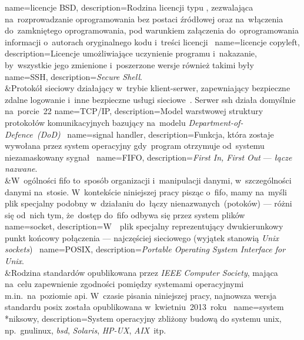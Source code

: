 {
	name={licencje BSD},
	description={Rodzina licencji typu , zezwalająca na~rozprowadzanie oprogramowania bez postaci źródłowej oraz na~włączenia do~zamkniętego oprogramowania, pod warunkiem załączenia do~oprogramowania informacji o~autorach oryginalnego kodu i~treści licencji~\cite{bsd,wiki:licenses-comparison}}
}
{
	name={licencje copyleft},
	description={Licencje umożliwiające uczynienie programu  i~nakazanie, by~wszystkie jego zmienione i~poszerzone wersje również takimi były~\cite{copyleft,wiki:licenses-comparison}}
}
{
	name={SSH},
	description={\emph{Secure Shell}.\\&Protokół sieciowy działający w~trybie klient-serwer, zapewniający bezpieczne zdalne logowanie i~inne bezpieczne usługi sieciowe~\cite{rfc:ssh}. Serwer \gls{ssh} działa domyślnie na~porcie~22}
}
{
	name={TCP/IP},
	description={Model warstwowej struktury protokołów komunikacyjnych bazujący na~modelu \emph{Department-of-Defence~(DoD)}~\cite{rfc:tcpip-dod}}
}
{
	name={signal handler},
	description={Funkcja, która zostaje wywołana przez system operacyjny gdy~program otrzymuje od~systemu niezamaskowany sygnał~\cite{signal-handler}}
}
{
	name={FIFO},
	description={\emph{First In, First Out} --- \emph{łącze nazwane}.\\&W~ogólności \gls{fifo} to~sposób organizacji i~manipulacji danymi, w~szczególności danymi na~stosie. W~kontekście niniejszej pracy pisząc o~\gls{fifo}, mamy na~myśli plik specjalny podobny w~działaniu do~łączy nienazwanych~(potoków) --- różni się od~nich tym, że~dostęp do~\gls{fifo} odbywa się przez system plików~\cite{fifo-manual}}
}
{
	name={socket},
	description={W~~plik specjalny reprezentujący dwukierunkowy punkt końcowy połączenia --- najczęściej sieciowego (wyjątek stanowią \emph{Unix sockets})~\cite{socket-definition-oracle}}
}
{
	name={\mbox{POSIX}},
	description={\emph{Portable Operating System Interface for Unix}.\\&Rodzina standardów opublikowana przez \emph{IEEE Computer Society}, mająca na~celu zapewnienie zgodności pomiędzy systemami operacyjnymi m.in.~na~poziomie \acrshort{api}. W~czasie pisania niniejszej pracy, najnowsza wersja standardu \gls{posix} została opublikowana w~kwietniu~2013~roku~\cite{posix-ieee,posix-opengroup}}
}
{
	name={system *niksowy},
	description={System operacyjny zbliżony budową do systemu \gls{unix}, np.~\gls{gnulinux}, \emph{bsd}, \emph{Solaris}, \emph{HP-UX}, \emph{AIX}~itp.~\cite{wiki:unix-like}}
}
